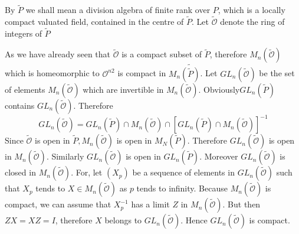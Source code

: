 By $\widetilde{P}$ we shall mean a division algebra of finite rank
over $P$, which is a locally compact valuated field, contained in the
centre of $\widetilde{P}$. Let $\tilde{\mathscr{O}}$ denote the ring of
integers of $\widetilde{P}$ 

As we have already seen that $\tilde{\mathscr{O}}$ is a compact subset of
$\widetilde{P}$, therefore $M_n(\tilde{\mathscr{O}})$ which is homeomorphic to
$\mathscr{O}^{n2}$ is compact in $ M_n\tilde{(\widetilde{P})}$. Let $G
L_n(\tilde{\mathscr{O}})$ be the set of elements
$M_n(\tilde{\mathscr{O}})$ which are 
invertible in $M_n(\tilde{\mathscr{O}})$. Obviously$G L_n(\widetilde{P})$
contains $G L_n(\tilde{\mathscr{O}})$. Therefore  
$$
G L_n(\tilde{\mathscr{O}})=G L_n(\widetilde{P})\cap
M_n(\tilde{\mathscr{O}}) \cap [G 
  L_n(\widetilde{P}) \cap M_n(\tilde{\mathscr{O}})]^{-1} 
$$
Since $\tilde{\mathscr{O}}$ is open in
$\widetilde{P}, M_n(\tilde{\mathscr{O}})$ is open in
$M_N(\tilde{P})$. Therefore $G L_n(\tilde{\mathscr{O}})$ is 
open in $M_n(\tilde{\mathscr{O}})$. Similarly $G
L_n(\tilde{\mathscr{O}})$ is open in 
$G L_n(\widetilde{P})$. Moreover $G L_n(\tilde{\mathscr{O}})$ is closed in
$M_n(\tilde{\mathscr{O}})$. For, let $(X_p)$ be a sequence of elements in $G
L_n(\tilde{\mathscr{O}})$ such that $X_p$ tends to $X \in
M_n(\tilde{\mathscr{O}})$ as 
$p$ tends to infinity. Because $M_n(\tilde{\mathscr{O}})$ is compact, we can
assume that $X^{-1}_p$ has a limit $Z$ in $M_n(\tilde{\mathscr{O}})$. But then
$ZX = XZ = I$, therefore $X$ belongs to $G L_n(\tilde{\mathscr{O}})$. Hence $G
L_n(\tilde{\mathscr{O}})$ is compact. 

